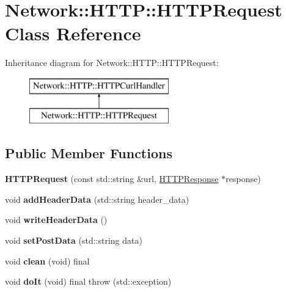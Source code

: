 \hypertarget{classNetwork_1_1HTTP_1_1HTTPRequest}{}\section{Network\+:\+:H\+T\+TP\+:\+:H\+T\+T\+P\+Request Class Reference}
\label{classNetwork_1_1HTTP_1_1HTTPRequest}
Inheritance diagram for Network\+:\+:H\+T\+TP\+:\+:H\+T\+T\+P\+Request\+:\begin{figure}[H]
\begin{center}
\leavevmode
\includegraphics[height=2.000000cm]{d8/dd8/classNetwork_1_1HTTP_1_1HTTPRequest}
\end{center}
\end{figure}
\subsection*{Public Member Functions}
\begin{DoxyCompactItemize}
\item 
\mbox{\label{classNetwork_1_1HTTP_1_1HTTPRequest_a171849a898d533a98d3f0c990da69f81}} 
{\bfseries H\+T\+T\+P\+Request} (const std\+::string \&url, \hyperlink{classNetwork_1_1HTTP_1_1HTTPResponse}{H\+T\+T\+P\+Response} $\ast$response)
\item 
\mbox{\label{classNetwork_1_1HTTP_1_1HTTPRequest_a56baeab19cac0f566dc36fe3a2e54523}} 
void {\bfseries add\+Header\+Data} (std\+::string header\+\_\+data)
\item 
\mbox{\label{classNetwork_1_1HTTP_1_1HTTPRequest_a5bc18233f2aa7b6e2653f820469fb986}} 
void {\bfseries write\+Header\+Data} ()
\item 
\mbox{\label{classNetwork_1_1HTTP_1_1HTTPRequest_a6400e112a09b1f324d9ba118bbac7f6f}} 
void {\bfseries set\+Post\+Data} (std\+::string data)
\item 
\mbox{\label{classNetwork_1_1HTTP_1_1HTTPRequest_a4a79ab13074db74c2b1e2f3991d4ac01}} 
void {\bfseries clean} (void) final
\item 
\mbox{\label{classNetwork_1_1HTTP_1_1HTTPRequest_a0aa1a681805c03a106d058ed9fdc7f20}} 
void {\bfseries do\+It} (void) final  throw (std\+::exception)
\end{DoxyCompactItemize}
